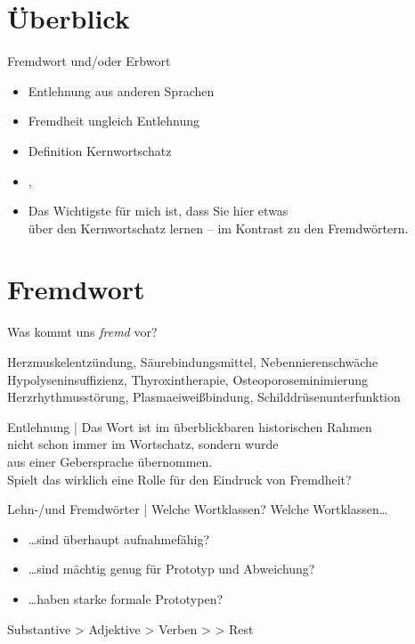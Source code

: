 \section{Überblick}

\begin{frame}
  {Fremdwort und\slash oder Erbwort}
  \onslide<+->
  \begin{itemize}[<+->]
    \item Entlehnung aus anderen Sprachen
    \item Fremdheit ungleich Entlehnung
    \item Definition Kernwortschatz
      \Zeile
    \item \citet{Eisenberg2018}, \citet{Schaefer2018b}\\
      \Zeile
    \item Das Wichtigste für mich ist, dass Sie hier etwas\\
      über den \alert{Kernwortschatz} lernen -- im Kontrast zu den Fremdwörtern.
  \end{itemize}
\end{frame}

\section{Fremdwort}

\begin{frame}
  {Was kommt uns \textit{fremd} vor?}
  \onslide<+->
  \onslide<+->
  \begin{exe}
    \ex Herzmuskelentzündung, Säurebindungsmittel, Nebennierenschwäche
    \onslide<+->
    \Halbzeile
    \ex Hypolyseninsuffizienz, Thyroxintherapie, Osteoporoseminimierung
    \onslide<+->
    \Halbzeile
    \ex Herzrhythmusstörung, Plasmaeiweißbindung, Schilddrüsenunterfunktion
  \end{exe}
  \onslide<+->
  \Zeile
  \alert{Entlehnung} | Das Wort ist im überblickbaren historischen Rahmen\\
  nicht schon immer im Wortschatz, sondern wurde\\
  aus einer Gebersprache übernommen.\\
  \onslide<+->
  \Zeile
  Spielt das wirklich eine Rolle für den Eindruck von \alert{Fremdheit}?
\end{frame}

\begin{frame}
  {Lehn-\slash und Fremdwörter | Welche Wortklassen?}
  \onslide<+->
  \onslide<+->
  Welche Wortklassen…\\
  \Halbzeile
  \begin{itemize}[<+->]
    \item \ldots sind überhaupt \alert{aufnahmefähig}?
    \item \ldots sind mächtig genug für Prototyp und Abweichung?
    \item \ldots haben starke formale Prototypen?
  \end{itemize}
  \onslide<+->
  \Zeile
  \alert{Substantive} > \alert{Adjektive} > \alert{Verben} >  > Rest
\end{frame}

